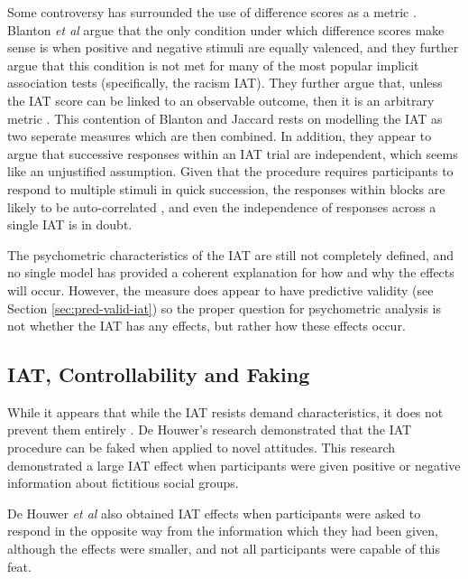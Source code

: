 Some controversy has surrounded the use of difference scores as a metric \cite{Blanton2006d}. Blanton \textit{et al} argue that the only condition under which difference scores make sense is when positive and negative stimuli are equally valenced, and they further argue that this condition is not met for many of the most popular implicit association tests (specifically, the racism IAT). They further argue that, unless the IAT score can be linked to an observable outcome, then it is an arbitrary metric \cite{Blanton2006}. This contention of Blanton and Jaccard rests on modelling the IAT as two seperate measures which are then combined. In addition, they appear to argue that successive responses within an IAT trial are independent, which seems like an unjustified assumption. Given that the procedure requires participants to respond to multiple stimuli in quick succession, the responses within blocks are likely to be auto-correlated \cite{mccleary1980applied}, and even the independence of responses across a single IAT is in doubt.

The psychometric characteristics of the IAT are still not completely defined, and no single model has provided a coherent explanation for how and why the effects will occur. However, the measure does appear to have predictive validity (see Section \ref{sec:pred-valid-iat}) so the proper question for psychometric analysis is not whether the IAT has any effects, but rather how these effects occur. 




\subsection{IAT, Controllability and Faking}
\label{sec:iat-contr-faking}

While it appears that while the IAT resists demand characteristics, it does not prevent them entirely \cite{DeHouwer2007b}. De Houwer's research demonstrated that the IAT procedure can be faked when applied to novel attitudes. This research  demonstrated a large IAT effect when participants were given positive or negative information about fictitious social groups. 

De Houwer \textit{et al} also obtained IAT effects when participants were asked to respond in the opposite way from the information which they had been given, although the effects were smaller, and not all participants were capable of this feat.  

